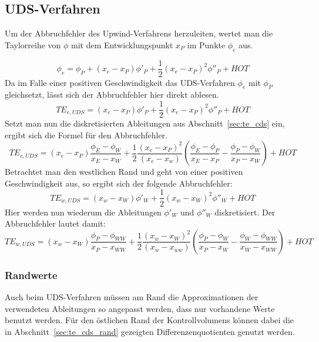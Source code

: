 \subsection{UDS-Verfahren}

Um der Abbruchfehler des Upwind-Verfahrens herzuleiten, wertet man die
Taylorreihe von $\phi$ mit dem Entwicklungspunkt $x_P$ im Punkte $\phi_e$
aus.

\begin{equation*}
  \phi_e = \phi_P +(x_e-x_P) \phi'_P + \frac{1}{2} (x_e-x_P)^2 \phi''_P+HOT
\end{equation*}
Da im Falle einer positiven Geschwindigkeit das UDS-Verfahren $\phi_e$ mit $\phi_P$
gleichsetzt, lässt sich der Abbruchfehler hier direkt ablesen.
\begin{equation*}
  TE_{e, UDS} = (x_e-x_P) \phi'_P + \frac{1}{2} (x_e-x_P)^2 \phi''_P+HOT
\end{equation*}
Setzt man nun die diskretisierten Ableitungen aus Abschnitt~\ref{sec:te_cds} ein,
ergibt sich die Formel für den Abbruchfehler.
\begin{equation}
  TE_{e, UDS} = (x_e-x_P) \frac{\phi_E-\phi_W}{x_E-x_W}+
  \frac{1}{2} \frac{(x_e-x_P)^2}{(x_e-x_w)} \left({\frac{\phi_E-\phi_P}{x_E-x_P}
  - \frac{\phi_P-\phi_W}{x_P-x_W} }\right)+HOT
\end{equation}
Betrachtet man den westlichen Rand und geht von einer positiven Geschwindigkeit aus,
so ergibt sich der folgende Abbruchfehler:
\begin{equation*}
  TE_{w, UDS} = (x_w-x_W) \phi'_W + \frac{1}{2} (x_w-x_W)^2 \phi''_W + HOT
\end{equation*}
Hier werden nun wiederum die Ableitungen $\phi'_W$ und $\phi''_W$ diskretisiert. Der
Abbruchfehler lautet damit:
\begin{equation}
  TE_{w, UDS} = (x_w-x_W) \frac{\phi_P-\phi_{WW}}{x_P-x_{WW}}+
  \frac{1}{2} \frac{(x_w-x_W)^2}{(x_w-x_{ww})} \left({\frac{\phi_P-\phi_W}{x_P-x_W}
  - \frac{\phi_W-\phi_{WW}}{x_W-x_{WW}} }\right)+HOT
\end{equation}



\subsubsection{Randwerte}

Auch beim UDS-Verfahren müssen am Rand die Approximationen der verwendeten Ableitungen
so angepasst werden, dass nur vorhandene Werte benutzt werden.
Für den östlichen Rand der Kontrollvolumens können dabei die in Abschnitt~\ref{sec:te_cds_rand}
gezeigten Differenzenquotienten genutzt werden.


